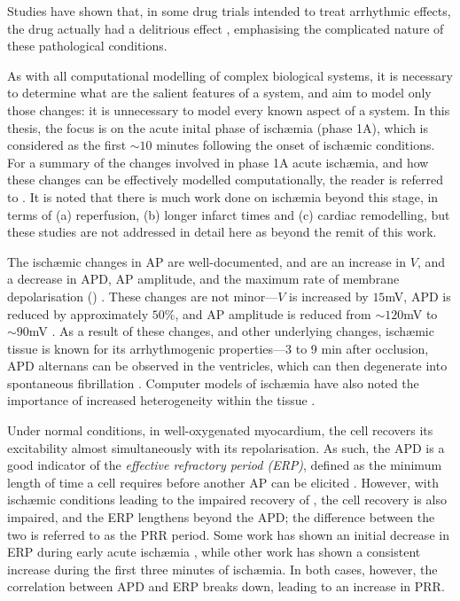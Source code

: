 \documentclass[../thesis-main.tex]{subfiles}
\begin{document}
 Studies have shown that, in some drug trials intended to treat arrhythmic effects, the drug actually had a delitrious effect \citep{Chen1998}, emphasising the complicated nature of these pathological conditions.
 
 As with all computational modelling of complex biological systems, it is necessary to determine what are the salient features of a system, and aim to model only those changes: it is unnecessary to model every known aspect of a system.  In this thesis, the focus is on the acute inital phase of isch\ae{}mia (phase 1A), which is considered as the first $\sim10$ minutes following the onset of isch\ae{}mic conditions. For a summary of the changes involved in phase 1A acute isch\ae{}mia, and how these changes can be effectively modelled computationally, the reader is referred to \citep{Rodriguez2006}. It is noted that there is much work done on isch\ae{}mia beyond this stage, in terms of (a) reperfusion, (b) longer infarct times and (c) cardiac remodelling, but these studies are not addressed in detail here as beyond the remit of this work.
 
 The isch\ae{}mic changes in AP are well-documented, and are an increase in $V$, and a decrease in APD, AP amplitude, and the maximum rate of membrane depolarisation (\dvdt{}) \citep{Carmeliet1999, Weiss1982, Weiss1992, Kleber1987a, Barrett1997, Janse2001}. These changes are not minor---$V$ is increased by $15$mV, APD is reduced by approximately $50\%$, and AP amplitude is reduced from $\sim120$mV to $\sim90$mV \citep{Rodriguez2002}. As a result of these changes, and other underlying changes, isch\ae{}mic tissue is known for its arrhythmogenic properties---3 to 9 min after occlusion, APD alternans can be observed in the ventricles, which can then degenerate into spontaneous fibrillation \citep{Downar1977}. Computer models of isch\ae{}mia have also noted the importance of increased heterogeneity within the tissue \citep{Avitall1979, Behrens1997}.
 
 Under normal conditions, in well-oxygenated myocardium, the cell recovers its excitability almost simultaneously with its repolarisation. As such, the APD is a good indicator of the \emph{effective refractory period (ERP)}, defined as the minimum length of time a cell requires before another AP can be elicited \citep{Huang2004}. However, with isch\ae{}mic conditions leading to the impaired recovery of \ina{}, the cell recovery is also impaired, and the ERP lengthens beyond the APD; the difference between the two is referred to as the PRR period. Some work has shown an initial decrease in ERP during early acute isch\ae{}mia \citep{Downar1977}, while other work has shown a consistent increase \citep{Sutton2000} during the first three minutes of isch\ae{}mia. In both cases, however, the correlation between APD and ERP breaks down, leading to an increase in PRR.
 
\end{document}
